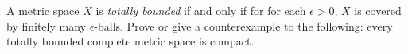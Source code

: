 A metric space $X$ is \emph{totally bounded} if and only if for for
each $\epsilon>0$, $X$ is covered by finitely many
$\epsilon$-balls. Prove or give a counterexample to the following: every
totally bounded complete metric space is compact.
